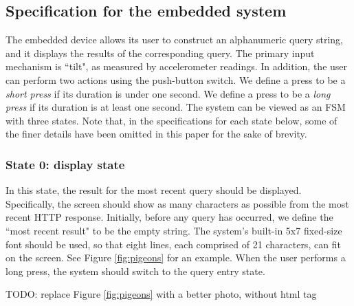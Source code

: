 \documentclass[12pt]{article}
\begin{document}
\subsection{Specification for the embedded system}
The embedded device allows its user to construct an alphanumeric query string, and it displays the results of the corresponding query.  The primary input mechanism is ``tilt", as measured by accelerometer readings.  In addition, the user can perform two actions using the push-button switch.  We define a press to be a \textit{short press} if its duration is under one second.  We define a press to be a \textit{long press} if its duration is at least one second.  The system can be viewed as an FSM with three states.  Note that, in the specifications for each state below, some of the finer details have been omitted in this paper for the sake of brevity.

\subsubsection{State 0: display state}
In this state, the result for the most recent query should be displayed.  Specifically, the screen should show as many characters as possible from the most recent HTTP response.  Initially, before any query has occurred, we define the ``most recent result" to be the empty string.  The system's built-in 5x7 fixed-size font should be used, so that eight lines, each comprised of 21 characters, can fit on the screen.  See Figure \ref{fig:pigeons} for an example.  When the user performs a long press, the system should switch to the query entry state.

TODO: replace Figure \ref{fig:pigeons} with a better photo, without html tag
\end{document}
